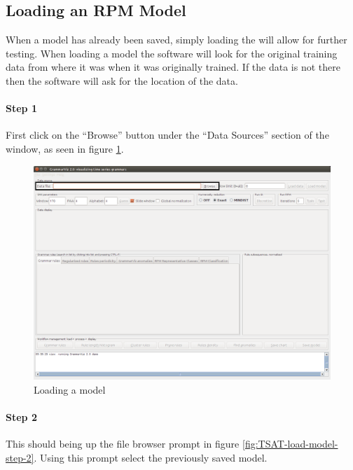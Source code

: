 \documentclass[letterpaper, 12pt]{article}
\begin{document}
\newpage
\subsection{Loading an RPM Model}
When a model has already been saved, simply loading the will allow for further testing. When loading a model the software will look for the original training data from where it was when it was originally trained. If the data is not there then the software will ask for the location of the data.

\paragraph{Step 1}
First click on the ``Browse'' button under the ``Data Sources'' section of the window, as seen in figure \ref{fig:TSAT-load-model-step-1}. 

\begin{figure}[h]
  \includegraphics[width=\textwidth]{TSAT-load-model-step-1}
  \caption{Loading a model}
  \label{fig:TSAT-load-model-step-1}
\end{figure}

\newpage
\paragraph{Step 2}
This should being up the file browser prompt in figure \ref{fig:TSAT-load-model-step-2}. Using this prompt select the previously saved model.
\end{document}
